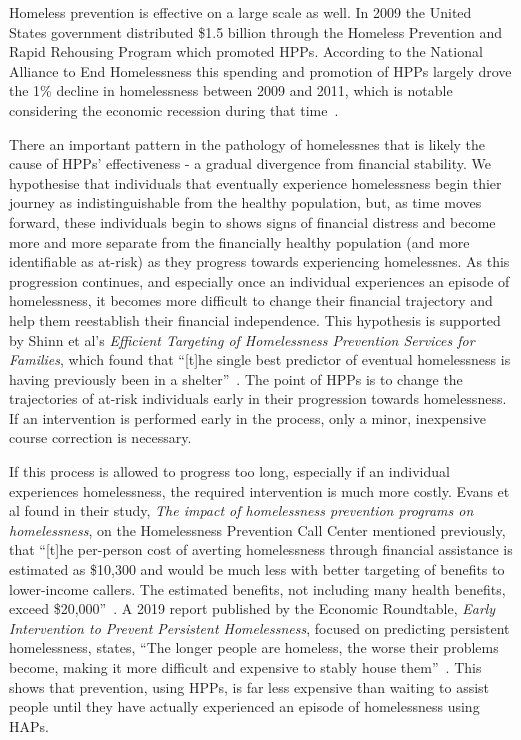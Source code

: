 \documentclass[10pt,letterpaper]{article}
\begin{document}
Homeless prevention is effective on a large scale as well. In 2009 the United States government distributed \$1.5 billion through the Homeless Prevention and Rapid Rehousing Program which promoted HPPs. According to the National Alliance to End Homelessness this spending and promotion of HPPs largely drove the 1\% decline in homelessness between 2009 and 2011, which is notable considering the economic recession during that time~\cite{shinn2013efficient}.

There an important pattern in the pathology of homelessnes that is likely the cause of HPPs' effectiveness - a gradual divergence from financial stability. We hypothesise that individuals that eventually experience homelessness begin thier journey as indistinguishable from the healthy population, but, as time moves forward, these individuals begin to shows signs of financial distress and become more and more separate from the financially healthy population (and more identifiable as at-risk) as they progress towards experiencing homelessnes. As this progression continues, and especially once an individual experiences an episode of homelessness, it becomes more difficult to change their financial trajectory and help them reestablish their financial independence. This hypothesis is supported by Shinn et al's \textit{Efficient Targeting of Homelessness Prevention Services for Families}, which found that ``[t]he single best predictor of eventual homelessness is having previously been in a shelter''~\cite{shinn2019homelessness}. The point of HPPs is to change the trajectories of at-risk individuals early in their progression towards homelessness. If an intervention is performed early in the process, only a minor, inexpensive course correction is necessary. 

If this process is allowed to progress too long, especially if an individual experiences homelessness, the required intervention is much more costly. Evans et al found in their study, \textit{The impact of homelessness prevention programs on homelessness}, on the Homelessness Prevention Call Center mentioned previously, that ``[t]he per-person cost of averting homelessness through financial assistance is estimated as \$10,300 and would be much less with better targeting of benefits to lower-income callers. The estimated benefits, not including many health benefits, exceed \$20,000''~\cite{evans2016impact}. A 2019 report published by the Economic Roundtable, \textit{Early Intervention to Prevent Persistent Homelessness}, focused on predicting persistent homelessness, states, ``The longer people are homeless, the worse their problems become, making it more difficult and expensive to stably house them''~\cite{toros2019early}. This shows that prevention, using HPPs, is far less expensive than waiting to assist people until they have actually experienced an episode of homelessness using HAPs.
\end{document}
